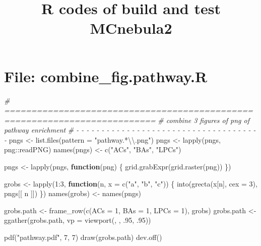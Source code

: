 \documentclass[
]{article}
\title{R codes of build and test MCnebula2}
\author{}
\date{\vspace{-2.5em}}
\newenvironment{Shaded}{\begin{snugshade}}{\end{snugshade}}
\newcommand{\AttributeTok}[1]{\textcolor[rgb]{0.77,0.63,0.00}{#1}}
\newcommand{\CommentTok}[1]{\textcolor[rgb]{0.56,0.35,0.01}{\textit{#1}}}
\newcommand{\ControlFlowTok}[1]{\textcolor[rgb]{0.13,0.29,0.53}{\textbf{#1}}}
\newcommand{\DecValTok}[1]{\textcolor[rgb]{0.00,0.00,0.81}{#1}}
\newcommand{\FunctionTok}[1]{\textcolor[rgb]{0.00,0.00,0.00}{#1}}
\newcommand{\NormalTok}[1]{#1}
\newcommand{\OtherTok}[1]{\textcolor[rgb]{0.56,0.35,0.01}{#1}}
\newcommand{\SpecialCharTok}[1]{\textcolor[rgb]{0.00,0.00,0.00}{#1}}
\newcommand{\StringTok}[1]{\textcolor[rgb]{0.31,0.60,0.02}{#1}}
\begin{document}
\maketitle

{
\setcounter{tocdepth}{3}
\tableofcontents
}
\hypertarget{file-combine_fig.pathway.r}{%
\section{File: combine\_fig.pathway.R}\label{file-combine_fig.pathway.r}}

\begin{Shaded}
\begin{Highlighting}[]
\CommentTok{\# ==========================================================================}
\CommentTok{\# combine 3 figures of png of pathway enrichment}
\CommentTok{\# {-} {-} {-} {-} {-} {-} {-} {-} {-} {-} {-} {-} {-} {-} {-} {-} {-} {-} {-} {-} {-} {-} {-} {-} {-} {-} {-} {-} {-} {-} {-} {-} {-} {-} {-} {-} {-}}
\NormalTok{pngs }\OtherTok{\textless{}{-}} \FunctionTok{list.files}\NormalTok{(}\AttributeTok{pattern =} \StringTok{"pathway.*}\SpecialCharTok{\textbackslash{}\textbackslash{}}\StringTok{.png"}\NormalTok{)}
\NormalTok{pngs }\OtherTok{\textless{}{-}} \FunctionTok{lapply}\NormalTok{(pngs, png}\SpecialCharTok{::}\NormalTok{readPNG)}
\FunctionTok{names}\NormalTok{(pngs) }\OtherTok{\textless{}{-}} \FunctionTok{c}\NormalTok{(}\StringTok{"ACs"}\NormalTok{, }\StringTok{"BAs"}\NormalTok{, }\StringTok{"LPCs"}\NormalTok{)}

\NormalTok{pngs }\OtherTok{\textless{}{-}} \FunctionTok{lapply}\NormalTok{(pngs,}
  \ControlFlowTok{function}\NormalTok{(png) \{}
    \FunctionTok{grid.grabExpr}\NormalTok{(}\FunctionTok{grid.raster}\NormalTok{(png))}
\NormalTok{  \})}

\NormalTok{grobs }\OtherTok{\textless{}{-}} \FunctionTok{lapply}\NormalTok{(}\DecValTok{1}\SpecialCharTok{:}\DecValTok{3}\NormalTok{,}
  \ControlFlowTok{function}\NormalTok{(n, }\AttributeTok{x =} \FunctionTok{c}\NormalTok{(}\StringTok{"a"}\NormalTok{, }\StringTok{"b"}\NormalTok{, }\StringTok{"c"}\NormalTok{)) \{}
    \FunctionTok{into}\NormalTok{(}\FunctionTok{grecta}\NormalTok{(x[n], }\AttributeTok{cex =} \DecValTok{3}\NormalTok{), pngs[[ n ]])}
\NormalTok{  \})}
\FunctionTok{names}\NormalTok{(grobs) }\OtherTok{\textless{}{-}} \FunctionTok{names}\NormalTok{(pngs)}

\NormalTok{grobs.path }\OtherTok{\textless{}{-}} \FunctionTok{frame\_row}\NormalTok{(}\FunctionTok{c}\NormalTok{(}\AttributeTok{ACs =} \DecValTok{1}\NormalTok{, }\AttributeTok{BAs =} \DecValTok{1}\NormalTok{, }\AttributeTok{LPCs =} \DecValTok{1}\NormalTok{), grobs)}
\NormalTok{grobs.path }\OtherTok{\textless{}{-}} \FunctionTok{ggather}\NormalTok{(grobs.path, }\AttributeTok{vp =} \FunctionTok{viewport}\NormalTok{(, , .}\DecValTok{95}\NormalTok{, .}\DecValTok{95}\NormalTok{))}

\FunctionTok{pdf}\NormalTok{(}\StringTok{"pathway.pdf"}\NormalTok{, }\DecValTok{7}\NormalTok{, }\DecValTok{7}\NormalTok{)}
\FunctionTok{draw}\NormalTok{(grobs.path)}
\FunctionTok{dev.off}\NormalTok{()}
\end{Highlighting}
\end{Shaded}
\end{document}
